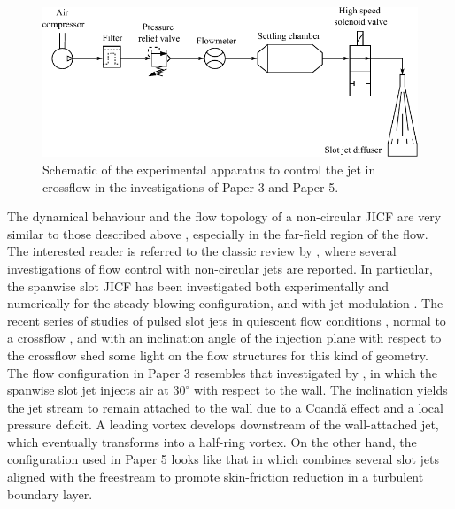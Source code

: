 \begin{figure}
    \centering
    \includegraphics[width = 0.95\linewidth]{figures/schematic_pneumatic.pdf}
    \caption{Schematic of the experimental apparatus to control the jet in crossflow in the investigations of Paper 3 and Paper 5.}
    \label{fig:schematic_pneumatic}
\end{figure}

The dynamical behaviour and the flow topology of a non-circular JICF are very similar to those described above \citep{liscinsky1996crossflow, plesniak2005scalar}, especially in the far-field region of the flow. The interested reader is referred to the classic review by \citet{Gutmark1999noncirc}, where several investigations of flow control with non-circular jets are reported. In particular, the spanwise slot JICF has been investigated both experimentally and numerically for the steady-blowing configuration, and with jet modulation \citep[see e.g.][]{park1999, Krogstad2000slitjet, steinfurth2021CFslot}. The recent series of studies of pulsed slot jets in quiescent flow conditions \citep{steinfurth2020quiescentslot}, normal to a crossflow \citep{steinfurth2021CFslot}, and with an inclination angle of the injection plane with respect to the crossflow \citep{Steinfurth2021pulsedjet} shed some light on the flow structures for this kind of geometry. The flow configuration in Paper 3 resembles that investigated by \citet{Steinfurth2021pulsedjet}, in which the spanwise slot jet injects air at $30^\circ$ with respect to the wall. The inclination yields the jet stream to remain attached to the wall due to a Coand\v{a} effect and a local pressure deficit. A leading vortex develops downstream of the wall-attached jet, which eventually transforms into a half-ring vortex. On the other hand, the configuration used in Paper 5 looks like that in \citet{cheng2021skin} which combines several slot jets aligned with the freestream to promote skin-friction reduction in a turbulent boundary layer. 

\clearpage \newpage
\ \thispagestyle{empty}